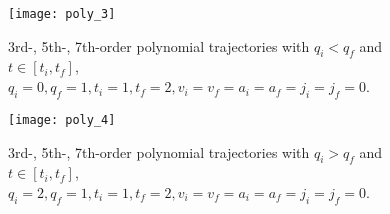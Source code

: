 \begin{figure}[H]
\centering
\texttt{[image: poly\_3]}
\caption{3rd-, 5th-, 7th-order polynomial trajectories with $q_i<q_f$ and $t\in[t_i,t_f]$, $q_i=0,q_f=1,t_i=1,t_f=2, v_i=v_f=a_i=a_f=j_i=j_f=0$.}
\label{fig:poly_3}
\end{figure}

\begin{figure}[H]
\centering
\texttt{[image: poly\_4]}
\caption{3rd-, 5th-, 7th-order polynomial trajectories with $q_i>q_f$ and $t\in[t_i,t_f]$, $q_i=2,q_f=1,t_i=1,t_f=2, v_i=v_f=a_i=a_f=j_i=j_f=0$.}
\label{fig:poly_4}
\end{figure}